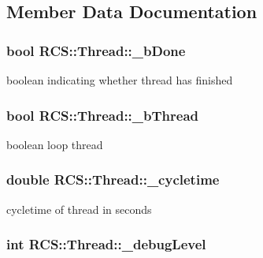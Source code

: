 \subsection{Member Data Documentation}
\hypertarget{classRCS_1_1Thread_acae3e9901f7de3fadd89fa67a30fabdf}{
\subsubsection[{\-\_\-b\-Done}]{\setlength{\rightskip}{0pt plus 5cm}bool R\-C\-S\-::\-Thread\-::\-\_\-b\-Done\hspace{0.3cm}{\ttfamily [protected]}}}\label{classRCS_1_1Thread_acae3e9901f7de3fadd89fa67a30fabdf}
boolean indicating whether thread has finished \hypertarget{classRCS_1_1Thread_acf46e3695b682bf24b8c80d0316edd82}{
\subsubsection[{\-\_\-b\-Thread}]{\setlength{\rightskip}{0pt plus 5cm}bool R\-C\-S\-::\-Thread\-::\-\_\-b\-Thread\hspace{0.3cm}{\ttfamily [protected]}}}\label{classRCS_1_1Thread_acf46e3695b682bf24b8c80d0316edd82}
boolean loop thread \hypertarget{classRCS_1_1Thread_ae0fa1f2cd2d13eaad9ecb2c649cb6158}{
\subsubsection[{\-\_\-cycletime}]{\setlength{\rightskip}{0pt plus 5cm}double R\-C\-S\-::\-Thread\-::\-\_\-cycletime\hspace{0.3cm}{\ttfamily [protected]}}}\label{classRCS_1_1Thread_ae0fa1f2cd2d13eaad9ecb2c649cb6158}
cycletime of thread in seconds \hypertarget{classRCS_1_1Thread_a33e768da1acf4a1deec407edeb656dc2}{
\subsubsection[{\-\_\-debug\-Level}]{\setlength{\rightskip}{0pt plus 5cm}int R\-C\-S\-::\-Thread\-::\-\_\-debug\-Level\hspace{0.3cm}{\ttfamily [protected]}}}\label{classRCS_1_1Thread_a33e768da1acf4a1deec407edeb656dc2}
